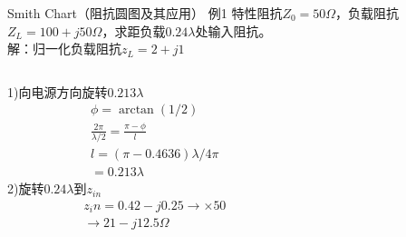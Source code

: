\begin{frame}{Smith Chart（阻抗圆图及其应用）}
  例1 \quad 特性阻抗$Z_0=50\Omega$，负载阻抗$Z_L=100+j50\Omega$，求距负载$0.24\lambda$处输入阻抗。\\
  解：归一化负载阻抗$z_L=2+j1$\\
  \begin{columns}
    \begin{column}{0.5\linewidth}
      1)\quad 向电源方向旋转$0.213\lambda$
      \begin{align*}
        \phi=\arctan(1/2)\\
        \frac{2\pi}{\lambda/2}=\frac{\pi-\phi}{l}\\
        l =(\pi-0.4636)\lambda/4\pi\\
        =0.213\lambda
      \end{align*}
      2)\quad 旋转$0.24\lambda$到$z_{in}$
      \begin{align*}
        z_in=0.42-j0.25\rightarrow\times 50\\
        \rightarrow 21-j12.5\Omega
      \end{align*}
    \end{column}
    \begin{column}{0.5\linewidth}

\end{column}
\end{columns}
\end{frame}
